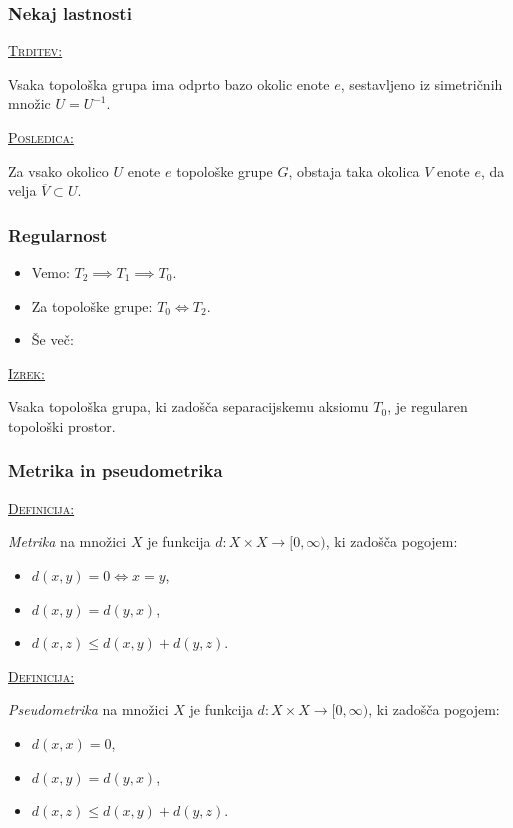\documentclass[a4paper, 12pt]{beamer}
\newenvironment{matematika}[1]{
\textcolor{bostonuniversityred}{\underline{\textsc{#1:}}}
}{
}
\begin{document}
\begin{frame}
\frametitle{Nekaj lastnosti}
\begin{matematika}{Trditev}
Vsaka topološka grupa ima odprto bazo okolic enote $e$, sestavljeno iz simetričnih množic $U = U^{-1}$.
\end{matematika} \newline

\begin{matematika}{Posledica}
Za vsako okolico $U$ enote $e$ topološke grupe $G$, obstaja taka okolica $V$ enote $e$, da velja $\overline{V} \subset U$.
\end{matematika}
\end{frame}

\begin{frame}
\frametitle{Regularnost}
\begin{itemize}[label=]
\item Vemo: $T_2 \implies T_1 \implies T_0$.
\item Za topološke grupe: $T_0 \iff T_2$.
\item Še več:
\end{itemize}

\begin{matematika}{Izrek}
Vsaka topološka grupa, ki zadošča separacijskemu aksiomu $T_0$, je regularen topološki prostor.
\end{matematika}
\end{frame}

\begin{frame}
\frametitle{Metrika in pseudometrika}
\begin{matematika}{Definicija}
	\emph{Metrika} na množici $X$ je funkcija $d: X \times X \to [0,\infty)$, ki zadošča pogojem:
	\begin{itemize}[label=]
		\item $d(x, y) = 0 \iff x = y$,
		\item $d(x, y) = d(y, x)$,
		\item $d(x, z) \leq d(x, y) + d(y, z)$.
	\end{itemize}
\end{matematika}

\pause

\begin{matematika}{Definicija}
	\emph{Pseudometrika} na množici $X$ je funkcija $d: X \times X \to [0,\infty)$, ki zadošča pogojem:
	\begin{itemize}[label=]
		\item $d(x, x) = 0$,
		\item $d(x, y) = d(y, x)$,
		\item $d(x, z) \leq d(x, y) + d(y, z)$.
	\end{itemize}
\end{matematika}
\end{frame}
\end{document}
